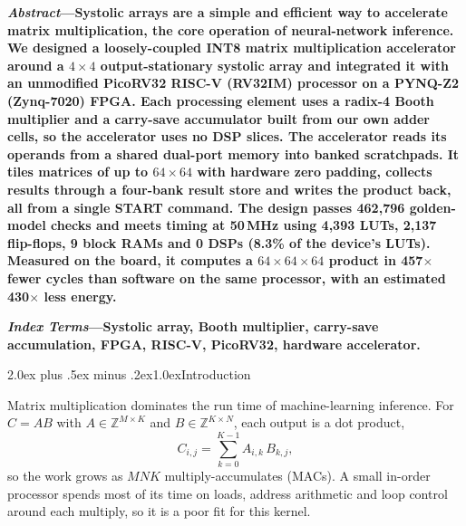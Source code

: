 \documentclass[10pt,twocolumn,a4paper]{article}
\makeatletter
\renewcommand\section{\@startsection{section}{1}{\z@}%
  {2.0ex plus .5ex minus .2ex}{1.0ex}{\centering\normalfont\scshape}}
\makeatother
\begin{document}

\noindent\textbf{\textit{Abstract}---Systolic arrays are a simple and
efficient way to accelerate matrix multiplication, the core operation of
neural-network inference. We designed a loosely-coupled INT8 matrix
multiplication accelerator around a $4\times4$ output-stationary systolic
array and integrated it with an unmodified PicoRV32 RISC-V (RV32IM) processor
on a PYNQ-Z2 (Zynq-7020) FPGA. Each processing element uses a radix-4 Booth
multiplier and a carry-save accumulator built from our own adder cells, so the
accelerator uses no DSP slices. The accelerator reads its operands from a shared
dual-port memory into banked scratchpads. It tiles matrices of up to
$64\times64$ with hardware zero padding, collects results through a four-bank
result store and writes the product back, all from a single START command.
The design passes 462,796 golden-model checks and meets timing at 50\,MHz
using 4,393 LUTs, 2,137 flip-flops, 9 block RAMs and 0 DSPs (8.3\% of the
device's LUTs). Measured on the board, it computes a $64\times64\times64$
product in 457$\times$ fewer cycles than software on the same processor, with
an estimated 430$\times$ less energy.}

\vspace{0.5em}
\noindent\textbf{\textit{Index Terms}---Systolic array, Booth multiplier,
carry-save accumulation, FPGA, RISC-V, PicoRV32, hardware accelerator.}

\section{Introduction}

Matrix multiplication dominates the run time of machine-learning inference.
For $C=AB$ with $A\in\mathbb{Z}^{M\times K}$ and $B\in\mathbb{Z}^{K\times N}$,
each output is a dot product,
\begin{equation}
C_{i,j}=\sum_{k=0}^{K-1}A_{i,k}\,B_{k,j},
\end{equation}
so the work grows as $MNK$ multiply-accumulates (MACs). A small in-order
processor spends most of its time on loads, address arithmetic and loop control
around each multiply, so it is a poor fit for this kernel.
\end{document}
